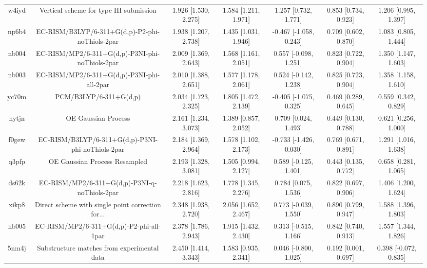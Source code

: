 \documentclass{article}
\begin{document}
\begin{center}
\begin{longtable}{|ccccccc|}
 w4iyd &            Vertical scheme for type III submission &  1.926 [1.530, 2.275] &  1.584 [1.211, 1.971] &     1.257 [0.732, 1.771] &  0.853 [0.734, 0.923] &   1.206 [0.995, 1.397] \\
 np6b4 &    EC-RISM/B3LYP/6-311+G(d,p)-P2-phi-noThiols-2par &  1.938 [1.207, 2.738] &  1.435 [1.031, 1.946] &   -0.467 [-1.058, 0.243] &  0.709 [0.602, 0.870] &   1.083 [0.805, 1.444] \\
 nb004 &    EC-RISM/MP2/6-311+G(d,p)-P3NI-phi-noThiols-2par &  2.009 [1.369, 2.643] &  1.568 [1.161, 2.051] &    0.557 [-0.098, 1.251] &  0.823 [0.722, 0.904] &   1.350 [1.147, 1.603] \\
 nb003 &         EC-RISM/MP2/6-311+G(d,p)-P3NI-phi-all-2par &  2.010 [1.388, 2.651] &  1.577 [1.178, 2.061] &    0.524 [-0.142, 1.238] &  0.825 [0.723, 0.904] &   1.358 [1.158, 1.610] \\
 yc70m &                             PCM/B3LYP/6-311+G(d,p) &  2.034 [1.723, 2.325] &  1.805 [1.472, 2.139] &   -0.405 [-1.075, 0.325] &  0.469 [0.289, 0.645] &   0.559 [0.342, 0.829] \\
 hytjn &                                OE Gaussian Process &  2.161 [1.234, 3.073] &  1.389 [0.857, 2.052] &     0.709 [0.024, 1.493] &  0.449 [0.130, 0.788] &   0.621 [0.256, 1.000] \\
 f0gew &  EC-RISM/B3LYP/6-311+G(d,p)-P3NI-phi-noThiols-2par &  2.184 [1.369, 2.964] &  1.578 [1.102, 2.173] &   -0.733 [-1.426, 0.030] &  0.769 [0.671, 0.891] &   1.291 [1.016, 1.638] \\
 q3pfp &                      OE Gaussian Process Resampled &  2.193 [1.328, 3.081] &  1.505 [0.994, 2.127] &    0.589 [-0.125, 1.401] &  0.443 [0.135, 0.772] &   0.658 [0.281, 1.065] \\
 ds62k &      EC-RISM/MP2/6-311+G(d,p)-P3NI-q-noThiols-2par &  2.218 [1.623, 2.816] &  1.778 [1.345, 2.276] &     0.784 [0.075, 1.536] &  0.822 [0.697, 0.906] &   1.406 [1.200, 1.624] \\
 xikp8 &  Direct scheme with single point correction for... &  2.348 [1.938, 2.720] &  2.056 [1.652, 2.467] &    0.773 [-0.039, 1.550] &  0.890 [0.799, 0.947] &   1.588 [1.396, 1.803] \\
 nb005 &           EC-RISM/MP2/6-311+G(d,p)-P2-phi-all-1par &  2.378 [1.786, 2.943] &  1.915 [1.432, 2.430] &    0.313 [-0.515, 1.166] &  0.842 [0.740, 0.913] &   1.557 [1.344, 1.826] \\
 5nm4j &        Substructure matches from experimental data &  2.450 [1.414, 3.343] &  1.583 [0.935, 2.341] &    0.046 [-0.800, 1.025] &  0.192 [0.001, 0.697] &  0.398 [-0.072, 0.835] \\

\end{longtable}
\end{center}
\end{document}
